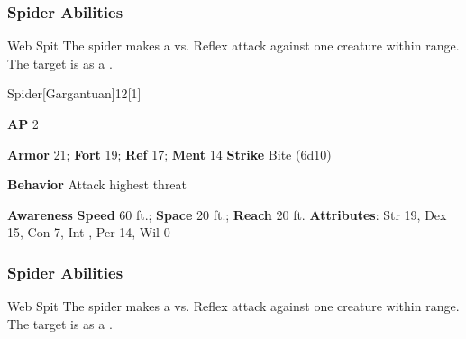 \subsubsection{Spider Abilities}

\begin{freeability}{Web Spit}
The spider makes a  vs. Reflex attack against one creature within \rnglong range.
\hit The target is  as a .
\end{freeability}

\begin{monsection}{Spider}[Gargantuan]{12}[1]
\vspace{-1em}\vspace{-1em}
\begin{spellcontent}
\begin{spelltargetinginfo}
{\textbf{AP} 2}

\pari \textbf{Armor} 21;
\textbf{Fort} 19;
\textbf{Ref} 17;
\textbf{Ment} 14
\pari \textbf{Strike} Bite  (6d10)



\pari \textbf{Behavior} Attack highest threat
\end{spelltargetinginfo}
\end{spellcontent}

\begin{monsterfooter}
\pari \textbf{Awareness} 
\pari \textbf{Speed} 60 ft.;
\textbf{Space} 20 ft.;
\textbf{Reach} 20 ft.
\pari \textbf{Attributes}:
Str 19,
Dex 15,
Con 7,
Int ,
Per 14,
Wil 0
\end{monsterfooter}
\end{monsection}


\subsubsection{Spider Abilities}

\begin{freeability}{Web Spit}
The spider makes a  vs. Reflex attack against one creature within \rnglong range.
\hit The target is  as a .
\end{freeability}


